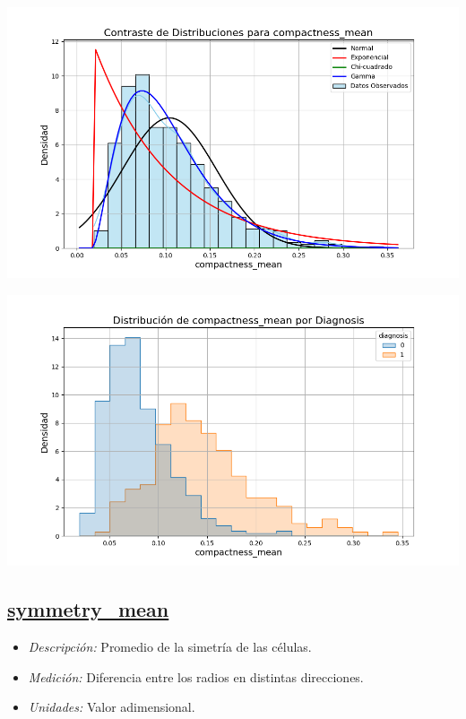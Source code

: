\documentclass[a4paper, 12pt]{article}
\begin{document}
\includegraphics[width=\textwidth]{../Plots/plots_stats/compactness_mean/distribuciones_conocidas_compactness_mean.png}

\includegraphics[width=\textwidth]{../Plots/plots_diagnosis/distribucion_compactness_mean_por_diagnosis.png}

\subsection*{\underline{symmetry\_mean}}
    \begin{itemize}
	\item \textit{Descripción:} Promedio de la simetría de las células.
	\item \textit{Medición:} Diferencia entre los radios en distintas direcciones.
	\item \textit{Unidades:} Valor adimensional.
\end{itemize}
\end{document}
